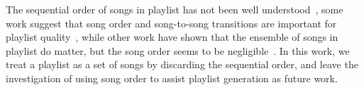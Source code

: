 The sequential order of songs in playlist has not been well understood~\cite{schedl2017},
some work suggest that song order and song-to-song transitions are important
for playlist quality~\cite{mcfee2012hypergraph,kamehkhosh2018automated},
while other work have shown that the ensemble of songs in playlist do matter,
but the song order seems to be negligible~\cite{tintarev2017sequences,vall2017importance}.
In this work, we treat a playlist as a set of songs by discarding the sequential order,
and leave the investigation of using song order to assist playlist generation as future work.

